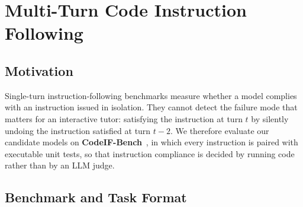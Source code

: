 %
%
%
%

\providecommand{\IA}{\mathrm{IA}}
\providecommand{\CA}{\mathrm{CA}}
\providecommand{\IFR}{\mathrm{IFR}}
\providecommand{\CIF}{\mathrm{CIF}}

\section{Multi-Turn Code Instruction Following}
\label{app:multiturn-if}

\subsection{Motivation}

Single-turn instruction-following benchmarks measure whether a model complies
with an instruction issued in isolation. They cannot detect the failure mode
that matters for an interactive tutor: satisfying the instruction at turn $t$
by silently undoing the instruction satisfied at turn $t-2$. We therefore
evaluate our candidate models on \textbf{CodeIF-Bench}~\cite{wang2025codeif},
in which every instruction is paired with executable unit tests, so that
instruction compliance is decided by running code rather than by an LLM judge.

\subsection{Benchmark and Task Format}

